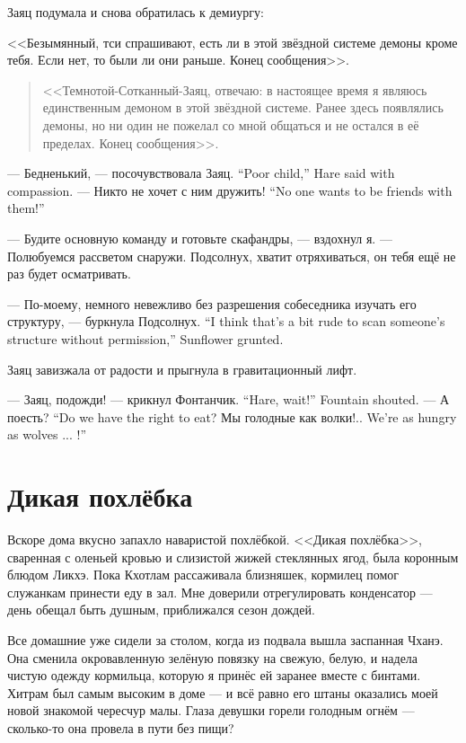 Заяц подумала и снова обратилась к демиургу:

<<Безымянный, тси спрашивают, есть ли в этой звёздной системе демоны кроме тебя.
Если нет, то были ли они раньше.
Конец сообщения>>.

\begin{quote}
<<Темнотой-Сотканный-Заяц, отвечаю: в настоящее время я являюсь единственным демоном в этой звёздной системе.
Ранее здесь появлялись демоны, но ни один не пожелал со мной общаться и не остался в её пределах.
Конец сообщения>>.
\end{quote}

{--- Бедненький, --- посочувствовала Заяц.}
{``Poor child,'' Hare said with compassion.}
{--- Никто не хочет с ним дружить!}
{``No one wants to be friends with them!''}

--- Будите основную команду и готовьте скафандры, --- вздохнул я.
--- Полюбуемся рассветом снаружи.
Подсолнух, хватит отряхиваться, он тебя ещё не раз будет осматривать.

{--- По-моему, немного невежливо без разрешения собеседника изучать его структуру, --- буркнула Подсолнух.}
{``I think that's a bit rude to scan someone's structure without permission,'' Sunflower grunted.}

Заяц завизжала от радости и прыгнула в гравитационный лифт.

{--- Заяц, подожди! --- крикнул Фонтанчик.}
{``Hare, wait!'' Fountain shouted.}
{--- А поесть?}
{``Do we have the right to eat?}
{Мы голодные как волки!..}
{We're as hungry as wolves ... !''}

\section{Дикая похлёбка}


Вскоре дома вкусно запахло наваристой похлёбкой.
<<Дикая похлёбка>>, сваренная с оленьей кровью и слизистой жижей стеклянных ягод, была коронным блюдом Ликхэ.
Пока Кхотлам рассаживала близняшек, кормилец помог служанкам принести еду в зал.
Мне доверили отрегулировать конденсатор --- день обещал быть душным, приближался сезон дождей.

Все домашние уже сидели за столом, когда из подвала вышла заспанная Чханэ.
Она сменила окровавленную зелёную повязку на свежую, белую, и надела чистую одежду кормильца, которую я принёс ей заранее вместе с бинтами.
Хитрам был самым высоким в доме --- и всё равно его штаны оказались моей новой знакомой чересчур малы.
Глаза девушки горели голодным огнём --- сколько-то она провела в пути без пищи?

